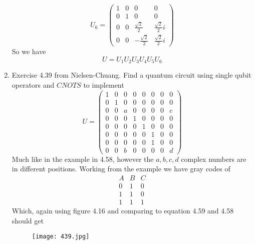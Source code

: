 \documentclass[12pt]{article}
\begin{document}
\begin{enumerate}
    $$ U_6 = \left(\begin{array}{cccc} 1 & 0 & 0 & 0 \\  0 & 1 & 0 & 0 \\ 0 & 0 & \frac{\sqrt{2}}{2} & \frac{\sqrt{2}}{2}i \\ 0 & 0 & - \frac{\sqrt{2}}{2}  &  \frac{\sqrt{2}}{2}i \end{array}\right)$$
    So we have 
    $$ U = U_1 U_2 U_3 U_4 U_5 U_6 $$ 

    \item Exercise 4.39 from Nielsen-Chuang. Find a quantum circuit using single qubit operators and $CNOTS$ to implement 
    $$ U = \left(\begin{array}{cccccccc} 1 & 0 & 0 & 0 & 0 & 0 & 0 & 0 \\  0 & 1 & 0 & 0 & 0 & 0 & 0 & 0 \\ 0 & 0 & a & 0 & 0 & 0 & 0 & c  \\ 0 & 0 & 0 & 1 & 0 & 0 & 0 & 0 \\ 0 & 0 & 0 & 0 & 1 & 0 & 0 & 0  \\ 0 & 0 & 0 & 0 & 0 & 1 & 0 & 0  \\ 0 & 0 & 0 & 0 & 0 & 1 & 0 & 0  \\ 0 & 0 & b & 0 & 0 & 0 & 0 & d \end{array}\right)$$
    Much like in the example in 4.58, however the $a,b,c,d$ complex numbers are in different positions. Working from the example we have gray codes of 
    $$ \begin{array}{cccc} A & B & C  \\  0 & 1 & 0 \\ 1 & 1 & 0\\ 1 & 1 & 1  \end{array}$$
    Which, again using figure 4.16 and comparing to equation 4.59 and 4.58 should get 
    \begin{figure}[h]
        \centering
        \texttt{[image: 439.jpg]}
    \end{figure}

\end{enumerate}
\pagebreak
\end{document}
